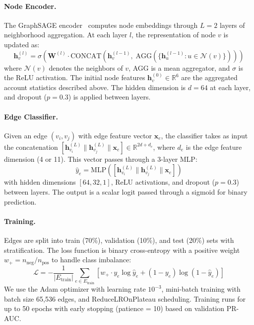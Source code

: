 \documentclass[conference]{IEEEtran}
\begin{document}
\paragraph{Node Encoder.}
The GraphSAGE encoder~\cite{hamilton2017graphsage} computes node embeddings through $L = 2$ layers of neighborhood aggregation. At each layer $l$, the representation of node $v$ is updated as:
\begin{equation}
    \mathbf{h}_v^{(l)} = \sigma\!\left(\mathbf{W}^{(l)} \cdot \text{CONCAT}\!\left(\mathbf{h}_v^{(l-1)},\; \text{AGG}\!\left(\{\mathbf{h}_u^{(l-1)} : u \in \mathcal{N}(v)\}\right)\right)\right)
\end{equation}
where $\mathcal{N}(v)$ denotes the neighbors of $v$, AGG is a mean aggregator, and $\sigma$ is the ReLU activation. The initial node features $\mathbf{h}_v^{(0)} \in \mathbb{R}^6$ are the aggregated account statistics described above. The hidden dimension is $d = 64$ at each layer, and dropout ($p = 0.3$) is applied between layers.

\paragraph{Edge Classifier.}
Given an edge $(v_i, v_j)$ with edge feature vector $\mathbf{x}_e$, the classifier takes as input the concatenation $[\mathbf{h}_{v_i}^{(L)} \| \mathbf{h}_{v_j}^{(L)} \| \mathbf{x}_e] \in \mathbb{R}^{2d + d_e}$, where $d_e$ is the edge feature dimension (4 or 11). This vector passes through a 3-layer MLP:
\begin{equation}
    \hat{y}_e = \text{MLP}([\mathbf{h}_{v_i}^{(L)} \| \mathbf{h}_{v_j}^{(L)} \| \mathbf{x}_e])
\end{equation}
with hidden dimensions $[64, 32, 1]$, ReLU activations, and dropout ($p = 0.3$) between layers. The output is a scalar logit passed through a sigmoid for binary prediction.

\paragraph{Training.}
Edges are split into train (70\%), validation (10\%), and test (20\%) sets with stratification. The loss function is binary cross-entropy with a positive weight $w_+ = n_\text{neg} / n_\text{pos}$ to handle class imbalance:
\begin{equation}
    \mathcal{L} = -\frac{1}{|E_\text{train}|} \sum_{e \in E_\text{train}} \left[ w_+ \cdot y_e \log \hat{y}_e + (1 - y_e) \log(1 - \hat{y}_e) \right]
\end{equation}
We use the Adam optimizer with learning rate $10^{-3}$, mini-batch training with batch size 65{,}536 edges, and ReduceLROnPlateau scheduling. Training runs for up to 50 epochs with early stopping (patience = 10) based on validation PR-AUC.
\end{document}
